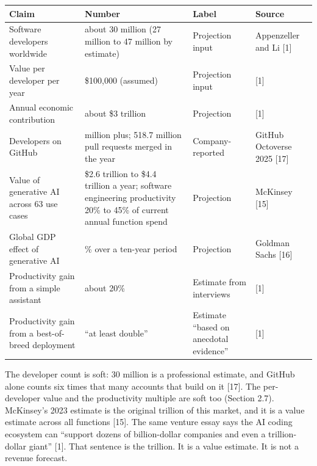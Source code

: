 \documentclass[
  10pt,
]{article}
\newcounter{none} %
\begin{document}
{\def\LTcaptype{none} %
\begin{longtable}[]{@{}
  >{\raggedright\arraybackslash}p{}
  >{\raggedright\arraybackslash}p{}
  >{\raggedright\arraybackslash}p{}
  >{\raggedright\arraybackslash}p{}@{}}
\toprule\noalign{}
\begin{minipage}[b]{\linewidth}\raggedright
Claim
\end{minipage} & \begin{minipage}[b]{\linewidth}\raggedright
Number
\end{minipage} & \begin{minipage}[b]{\linewidth}\raggedright
Label
\end{minipage} & \begin{minipage}[b]{\linewidth}\raggedright
Source
\end{minipage} \\
\midrule\noalign{}
\endhead
\bottomrule\noalign{}
\endlastfoot
Software developers worldwide & about 30 million (27 million to 47
million by estimate) & Projection input & Appenzeller and Li {[}1{]} \\
Value per developer per year & \$100,000 (assumed) & Projection input &
{[}1{]} \\
Annual economic contribution & about \$3 trillion & Projection &
{[}1{]} \\
Developers on GitHub & 180 million plus; 518.7 million pull requests
merged in the year & Company-reported & GitHub Octoverse 2025
{[}17{]} \\
Value of generative AI across 63 use cases & \$2.6 trillion to \$4.4
trillion a year; software engineering productivity 20\% to 45\% of
current annual function spend & Projection & McKinsey {[}15{]} \\
Global GDP effect of generative AI & 7\% over a ten-year period &
Projection & Goldman Sachs {[}16{]} \\
Productivity gain from a simple assistant & about 20\% & Estimate from
interviews & {[}1{]} \\
Productivity gain from a best-of-breed deployment & ``at least double''
& Estimate ``based on anecdotal evidence'' & {[}1{]} \\
\end{longtable}
}

The developer count is soft: 30 million is a professional estimate, and
GitHub alone counts six times that many accounts that build on it
{[}17{]}. The per-developer value and the productivity multiple are soft
too (Section 2.7). McKinsey's 2023 estimate is the original trillion of
this market, and it is a value estimate across all functions {[}15{]}.
The same venture essay says the AI coding ecosystem can ``support dozens
of billion-dollar companies and even a trillion-dollar giant'' {[}1{]}.
That sentence is the trillion. It is a value estimate. It is not a
revenue forecast.
\end{document}
